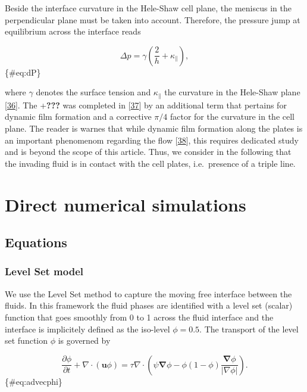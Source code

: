 \documentclass[]{article}
\begin{document}
Beside the interface curvature in the Hele-Shaw cell plane, the meniscus
in the perpendicular plane must be taken into account. Therefore, the
pressure jump at equilibrium across the interface reads

\[
\Delta p = \gamma \left(\frac{2}{h}+\kappa_{\parallel}\right),
\] \{\#eq:dP\}

where \(\gamma\) denotes the surface tension and \(\kappa_{\parallel}\)
the curvature in the Hele-Shaw plane
{[}\protect\hyperlink{ref-saffman1958penetration}{36}{]}. The
+\textbf{???} was completed in
{[}\protect\hyperlink{ref-park1984two}{37}{]} by an additional term that
pertains for dynamic film formation and a corrective \(\pi/4\) factor
for the curvature in the cell plane. The reader is warnes that while
dynamic film formation along the plates is an important phenomenom
regarding the flow {[}\protect\hyperlink{ref-jackson2015dynamic}{38}{]},
this requires dedicated study and is beyond the scope of this article.
Thus, we consider in the following that the invading fluid is in contact
with the cell plates, i.e.~presence of a triple line.

\hypertarget{direct-numerical-simulations}{%
\section{Direct numerical
simulations}\label{direct-numerical-simulations}}

\hypertarget{equations}{%
\subsection{Equations}\label{equations}}

\hypertarget{level-set-model}{%
\subsubsection{Level Set model}\label{level-set-model}}

We use the Level Set method to capture the moving free interface between
the fluids. In this framework the fluid phases are identified with a
level set (scalar) function that goes smoothly from 0 to 1 across the
fluid interface and the interface is implicitely defined as the
iso-level \(\phi=0.5\). The transport of the level set function \(\phi\)
is governed by

\[
\frac{\partial\phi}{\partial t}+\nabla\cdot(\mathbf{u}\phi)=\tau\nabla\cdot\left(\psi\boldsymbol{\nabla}\phi-\phi(1-\phi)\frac{\boldsymbol{\nabla}\phi}{\vert\nabla\phi\vert}\right).
\] \{\#eq:advecphi\}
\end{document}
